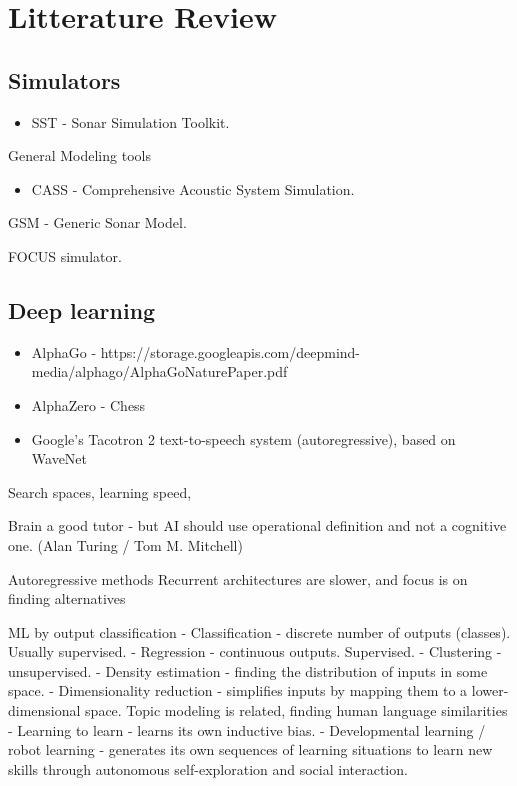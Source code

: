 \ifMonolithic\else\fi

\chapter{Litterature Review}


\section{Simulators}



\begin{itemize}
\item SST - Sonar Simulation Toolkit. \cite{Goddard}
\end{itemize}

General Modeling tools
\begin{itemize}
\item CASS - Comprehensive Acoustic System Simulation. \cite{Goddard}
\end{itemize}


GSM - Generic Sonar Model. 


FOCUS simulator. 

\section{Deep learning}

\begin{itemize}
\item AlphaGo - https://storage.googleapis.com/deepmind-media/alphago/AlphaGoNaturePaper.pdf
\item AlphaZero - Chess
\item Google’s Tacotron 2 text-to-speech system (autoregressive), based on WaveNet
\end{itemize}

Search spaces, learning speed, 

Brain a good tutor - but AI should use operational definition and not a cognitive one. (Alan Turing / Tom M. Mitchell)


Autoregressive methods
Recurrent architectures are slower, and focus is on finding alternatives

ML by output classification
- Classification - discrete number of outputs (classes). Usually supervised.
- Regression - continuous outputs. Supervised.
- Clustering - unsupervised.
- Density estimation - finding the distribution of inputs in some space.
- Dimensionality reduction - simplifies inputs by mapping them to a lower-dimensional space. Topic modeling is related, finding human language similarities
- Learning to learn - learns its own inductive bias.
- Developmental learning / robot learning - generates its own sequences of learning situations to learn new skills through autonomous self-exploration and social interaction.

